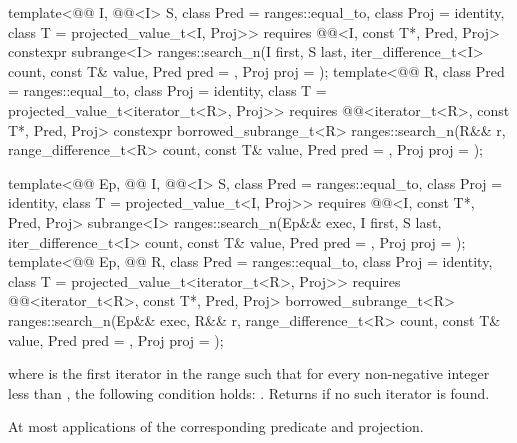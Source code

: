 %
\begin{itemdecl}
template<@@ I, @@<I> S,
         class Pred = ranges::equal_to, class Proj = identity,
         class T = projected_value_t<I, Proj>>
  requires @@<I, const T*, Pred, Proj>
  constexpr subrange<I>
    ranges::search_n(I first, S last, iter_difference_t<I> count,
                     const T& value, Pred pred = {}, Proj proj = {});
template<@@ R, class Pred = ranges::equal_to,
         class Proj = identity, class T = projected_value_t<iterator_t<R>, Proj>>
  requires @@<iterator_t<R>, const T*, Pred, Proj>
  constexpr borrowed_subrange_t<R>
    ranges::search_n(R&& r, range_difference_t<R> count,
                     const T& value, Pred pred = {}, Proj proj = {});

template<@@ Ep, @@ I, @@<I> S,
         class Pred = ranges::equal_to, class Proj = identity,
         class T = projected_value_t<I, Proj>>
  requires @@<I, const T*, Pred, Proj>
  subrange<I>
    ranges::search_n(Ep&& exec, I first, S last, iter_difference_t<I> count,
                     const T& value, Pred pred = {}, Proj proj = {});
template<@@ Ep, @@ R, class Pred = ranges::equal_to,
         class Proj = identity, class T = projected_value_t<iterator_t<R>, Proj>>
  requires @@<iterator_t<R>, const T*, Pred, Proj>
  borrowed_subrange_t<R>
    ranges::search_n(Ep&& exec, R&& r, range_difference_t<R> count,
                     const T& value, Pred pred = {}, Proj proj = {});
\end{itemdecl}

\begin{itemdescr}
\pnum
\returns
{}
where  is the first iterator in the range 
such that for every non-negative integer  less than ,
the following condition holds:
.
Returns  if no such iterator is found.

\pnum
\complexity
At most  applications
of the corresponding predicate and projection.
\end{itemdescr}

